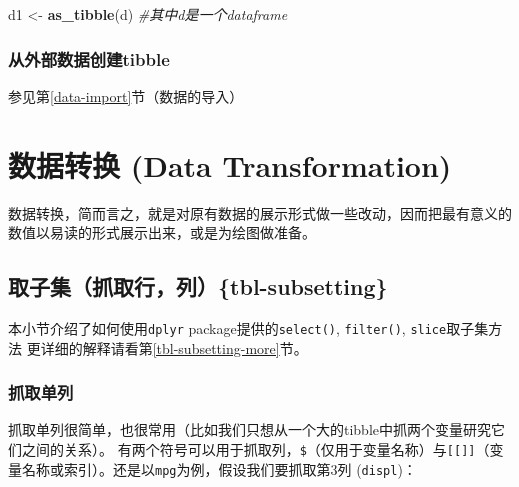 \documentclass[]{book}
\newenvironment{Shaded}{\begin{snugshade}}{\end{snugshade}}
\newcommand{\CommentTok}[1]{\textcolor[rgb]{0.56,0.35,0.01}{\textit{#1}}}
\newcommand{\DecValTok}[1]{\textcolor[rgb]{0.00,0.00,0.81}{#1}}
\newcommand{\KeywordTok}[1]{\textcolor[rgb]{0.13,0.29,0.53}{\textbf{#1}}}
\newcommand{\NormalTok}[1]{#1}
\newcommand{\OperatorTok}[1]{\textcolor[rgb]{0.81,0.36,0.00}{\textbf{#1}}}
\newcommand{\StringTok}[1]{\textcolor[rgb]{0.31,0.60,0.02}{#1}}
\begin{document}
\begin{Shaded}
\begin{Highlighting}[]
\NormalTok{d1 <-}\StringTok{ }\KeywordTok{as_tibble}\NormalTok{(d) }\CommentTok{#其中d是一个dataframe}
\end{Highlighting}
\end{Shaded}

\hypertarget{tibble-import}{%
\subsubsection{从外部数据创建tibble}\label{tibble-import}}

参见第\ref{data-import}节（数据的导入）

\hypertarget{data-transformation}{%
\section{数据转换 (Data Transformation)}\label{data-transformation}}

数据转换，简而言之，就是对原有数据的展示形式做一些改动，因而把最有意义的数值以易读的形式展示出来，或是为绘图做准备。

\hypertarget{tbl-subsetting}{%
\subsection{取子集（抓取行，列）\{tbl-subsetting\}}\label{tbl-subsetting}}

本小节介绍了如何使用\texttt{dplyr} package提供的\texttt{select()}, \texttt{filter()}, \texttt{slice}取子集方法
更详细的解释请看第\ref{tbl-subsetting-more}节。

\hypertarget{single-column}{%
\subsubsection{抓取单列}\label{single-column}}

抓取单列很简单，也很常用（比如我们只想从一个大的tibble中抓两个变量研究它们之间的关系）。 有两个符号可以用于抓取列，\texttt{\$}（仅用于变量名称）与\texttt{{[}{[}{]}{]}}（变量名称或索引）。还是以\texttt{mpg}为例，假设我们要抓取第3列 (\texttt{displ})：

\begin{Shaded}
\end{Shaded}
\end{document}
